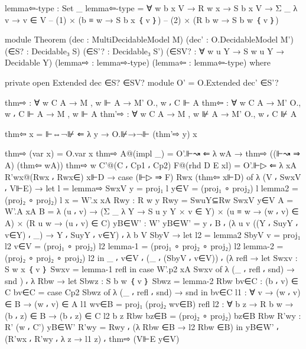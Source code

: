 \begin{spverbatim}
  lemma⇦-type : Set _
  lemma⇦-type =
    ∀ {w b x V} → R w x → S b x V →
    Σ _ λ v → v ∈ V
      -- (1)
      × (b ≡ w → S b x ｛ v ｝)
      -- (2)
      × (R b w → S b w ｛ v ｝)

  module Theorem
    (dec : MultiDecidableModel M)
    (dec' : O.DecidableModel M')
    (∈S? : Decidable₃ S)
    (∈S'? : Decidable₃ S')
    (∈SV? : ∀ {w u Y} → S w u Y → Decidable Y)
    (lemma⇨ : lemma⇨-type)
    (lemma⇦ : lemma⇦-type)
    where

    private
      open Extended dec ∈S? ∈SV?
      module O' = O.Extended dec' ∈S'?

      thm⇨ : ∀ {w C A} → M , w ⊩ A → M' O., w ⸴ C ⊩ A
      thm⇦ : ∀ {w C A} → M' O., w ⸴ C ⊩ A → M , w ⊩ A
      thm'⇨ : ∀ {w C A} → M , w ⊮ A → M' O., w ⸴ C ⊮ A

      thm⇦ x = ⊩⇔¬⊮ ⇐ λ {y → O.⊮→¬⊩ (thm'⇨ y) x}

      thm⇨ (var x) = O.var x
      thm⇨ A@(impl _) = O'.⊩↝ ⇐ λ {wA → thm⇨ ((⊩↝ ⇒ A) (thm⇦ wA))}
      thm⇨ {w} {C'@(C ⸴ Cp1 ⸴ Cp2)} F@(rhd {D} {E} xl) = O'.⊩▷ ⇐
        λ { {xA} R'wx@(Rwx ⸴ Rwx∈) x⊩D
          → case (⊩▷ ⇒ F) Rwx (thm⇦ x⊩D) of
          λ { (V ⸴ SwxV ⸴ V⊩E) →
          let
              l = lemma⇨ SwxV
              y = proj₁ l
              y∈V = (proj₁ ∘ proj₂) l
              lemma2 = (proj₂ ∘ proj₂) l
              x = W'.x xA
              Rwy : R w y
              Rwy = SwuY⊆Rw SwxV y∈V
              A = W'.A xA
              B = λ { (u ⸴ v) → (Σ _ λ Y
                → S u y Y × v ∈ Y) × (u ≡ w → (w ⸴ v) ∈ A) × (R u w → (u ⸴ v) ∈ C) }
              yB∈W' : W'
              yB∈W' = y ⸴ B ⸴
                (λ { {u} {v} ((Y ⸴ SuyY ⸴ v∈Y) ⸴ _) → Y ⸴ SuyY ⸴ v∈Y}) ⸴
                λ { {b} {V} SbyV →
                  let l2 = lemma2 SbyV
                      v = proj₁ l2
                      v∈V = (proj₁ ∘ proj₂) l2
                      lemma-1 = (proj₁ ∘ proj₂ ∘ proj₂) l2
                      lemma-2 = (proj₂ ∘ proj₂ ∘ proj₂) l2
                  in _ ⸴ v∈V ⸴ (_ ⸴ (SbyV ⸴ v∈V))
                ⸴ (λ { refl → let
                        Swxv : S w x ｛ v ｝
                        Swxv = lemma-1 refl
                      in case W'.p2 xA Swxv of λ { (_ ⸴ refl ⸴ snd) → snd} })
                ⸴ λ { Rbw → let
                              Sbwz : S b w ｛ v ｝
                              Sbwz = lemma-2 Rbw
                              bv∈C : (b ⸴ v) ∈ C
                              bv∈C = case Cp2 Sbwz of
                                λ { (_ ⸴ refl ⸴ snd) → snd}
                            in bv∈C} }
              l1 : ∀ {v} → (w ⸴ v) ∈ B → (w ⸴ v) ∈ A
              l1 wv∈B = proj₁ (proj₂ wv∈B) refl
              l2 : ∀ {b z} → R b w → (b ⸴ z) ∈ B → (b ⸴ z) ∈ C
              l2 {b} {z} Rbw bz∈B = (proj₂ ∘ proj₂) bz∈B Rbw
              R'wy : R' (w ⸴ C') yB∈W'
              R'wy = Rwy ⸴ (λ {Rbw ∈B → l2 Rbw ∈B})
          in
            yB∈W' ⸴ (R'wx ⸴ R'wy ⸴ λ {z → l1 z})
            ⸴ thm⇨ (V⊩E y∈V)
            }}


\end{spverbatim}
